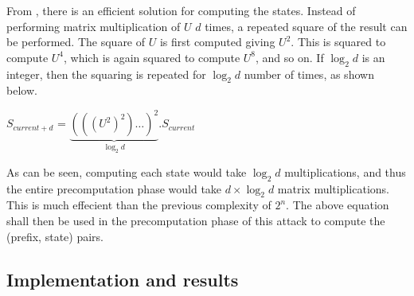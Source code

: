 From \cite{erik-discussions}, there is an efficient solution for computing the states. Instead of performing matrix multiplication of $U$ $d$ times, a repeated square of the result can be performed. The square of $U$ is first computed giving $U^2$. This is squared to compute $U^4$, which is again squared to compute $U^8$, and so on. If $\log_2{d}$ is an integer, then the squaring is repeated for $\log_2{d}$ number of times, as shown below.

\begin{center}
\large{$S_{current + d}$ = $\underbrace{(((U^2)^2) \dotsc )^2}_{\log_2{d}} . S_{current}$}\\
\end{center}
\label{eq:state-trans}

As can be seen, computing each state would take $\log_2{d}$ multiplications, and thus the entire precomputation phase would take $d \times \log_2{d}$ matrix multiplications. This is much effecient than the previous complexity of $2^n$. The above equation shall then be used in the precomputation phase of this attack to compute the (prefix, state) pairs.


\subsection{Implementation and results}

